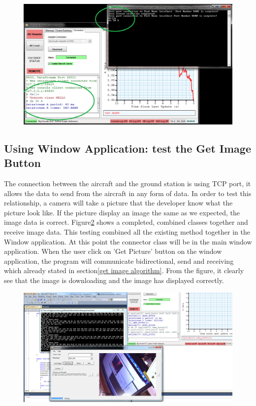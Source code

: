 \begin{figure}[H]
\begin{center}
\includegraphics[scale=1]{testing_screenshots/test_sending_test_text_useful.png}   
\end{center}
\caption{\label{test text}}
\end{figure}

\subsection{Using Window Application: test the Get Image Button}
The connection between the aircraft and the ground station is using TCP port, it allows the data to send from the aircraft in any form of data. 
In order to test this relationship, a camera will take a picture that the developer know what the picture look like. 
If the picture display an image the same as we expected, the image data is correct.
Figure\ref{camera testing1} shows a completed, combined classes together and receive image data.
This testing combined all the existing method together in the Window application.
At this point the connector class will be in the main window application.
When the user click on 'Get Picture' button on the window application, the program will communicate bidirectional, send and receiving which already stated in section\ref{get image algorithm}. 
From the figure, it clearly see that the image is downloading and the image has displayed correctly.

\begin{figure}[H]
\begin{center}
\includegraphics[scale=1]{testing_screenshots/cam_test_11.png}   
\end{center}
\caption{\label{camera testing1}}
\end{figure}

